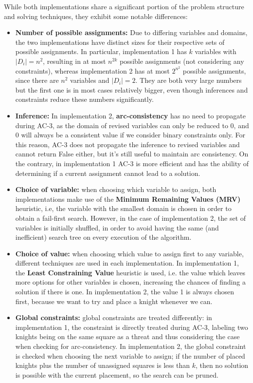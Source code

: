 \documentclass[a4paper,12pt]{article}
\begin{document}
While both implementations share a significant portion of the problem structure and solving techniques, they exhibit some notable differences:
\begin{itemize}
    \item \textbf{Number of possible assignments:} Due to differing variables and domains, the two implementations have distinct sizes for their respective sets of possible assignments. In particular, implementation 1 has \(k\) variables with \(|D_i|=n^2\), resulting in at most \(n^{2k}\) possible assignments (not considering any constraints), whereas implementation 2 has at most \(2^{n^2}\) possible assignments, since there are \(n^2\) variables and \(|D_i|=2\). They are both very large numbers but the first one is in most cases relatively bigger, even though inferences and constraints reduce these numbers significantly.
    \item \textbf{Inference:} In implementation 2, \textbf{arc-consistency} has no need to propagate during AC-3, as the domain of revised variables can only be reduced to {0}, and 0 will always be a consistent value if we consider binary constraints only. For this reason, AC-3 does not propagate the inference to revised variables and cannot return False either, but it's still useful to maintain arc consistency. On the contrary, in implementation 1 AC-3 is more efficient and has the ability of determining if a current assignment cannot lead to a solution.
    \item \textbf{Choice of variable:} when choosing which variable to assign, both implementations make use of the \textbf{Minimum Remaining Values (MRV)} heuristic, i.e, the variable with the smallest domain is chosen in order to obtain a fail-first search. However, in the case of implementation 2, the set of variables is initially shuffled, in order to avoid having the same (and inefficient) search tree on every execution of the algorithm.
    \item \textbf{Choice of value:} when choosing which value to assign first to any variable, different techniques are used in each implementation. In implementation 1, the \textbf{Least Constraining Value} heuristic is used, i.e. the value which leaves more options for other variables is chosen, increasing the chances of finding a solution if there is one. In implementation 2, the value 1 is always chosen first, because we want to try and place a knight whenever we can.
    \item \textbf{Global constraints:} global constraints are treated differently: in implementation 1, the constraint is directly treated during AC-3, labeling two knights being on the same square as a threat and thus considering the case when checking for arc-consistency. In implementation 2, the global constraint is checked when choosing the next variable to assign; if the number of placed knights plus the number of unassigned squares is less than \(k\), then no solution is possible with the current placement, so the search can be pruned.
\end{itemize}
\end{document}
